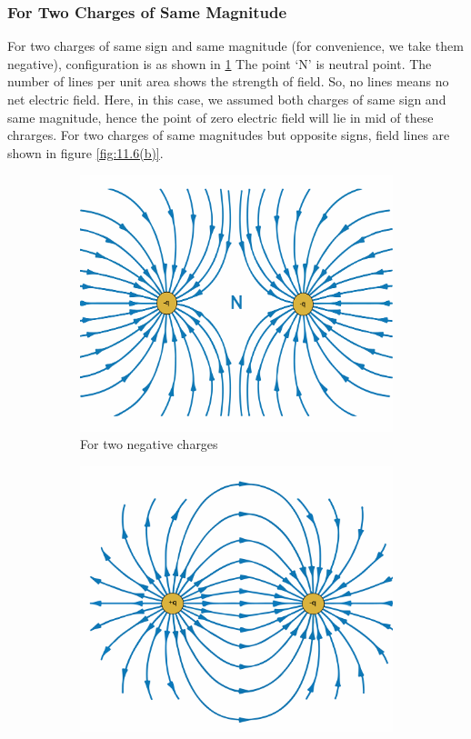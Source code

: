 \subsubsection{For Two Charges of Same Magnitude}
For two charges of same sign and same magnitude (for convenience,
we take them negative), configuration is as shown in \ref{fig:11.6(a)}
The point ‘N’ is neutral point. The number of lines per unit area 
shows the strength of field. So, no lines means no net electric field.
Here, in this case, we assumed both charges of same sign and same magnitude,
hence the point of zero electric field will lie in mid of these chrarges.
For two charges of same magnitudes but opposite signs,
field lines are shown in figure \ref{fig:11.6(b)}.

\begin{figure}[htbp]
  \centering
  \begin{subfigure}[t]{0.3\textwidth}
      \includegraphics[width=\textwidth]{Images/11.6a}
      \caption{For two negative charges}
      \label{fig:11.6(a)}
  \end{subfigure}
  \begin{subfigure}[t]{0.3\textwidth}
      \includegraphics[width=\textwidth]{Images/11.6b}

\end{subfigure}
\end{figure}
